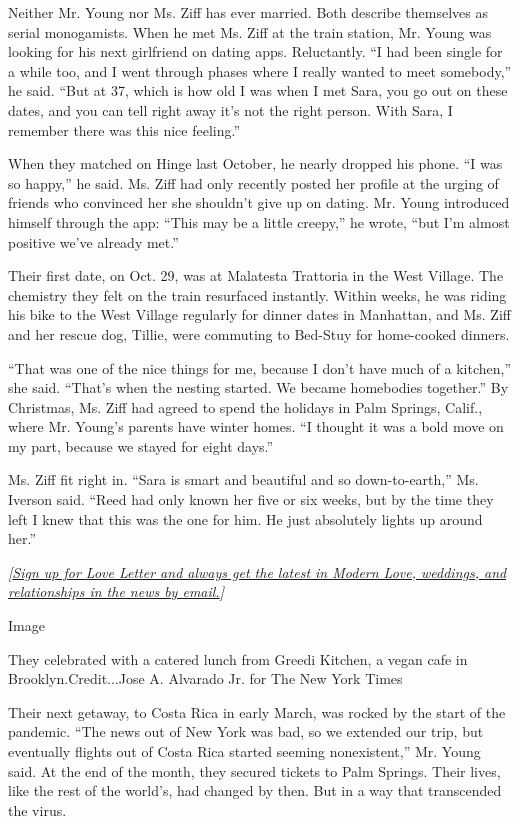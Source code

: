 Neither Mr. Young nor Ms. Ziff has ever married. Both describe
themselves as serial monogamists. When he met Ms. Ziff at the train
station, Mr. Young was looking for his next girlfriend on dating apps.
Reluctantly. ``I had been single for a while too, and I went through
phases where I really wanted to meet somebody,'' he said. ``But at 37,
which is how old I was when I met Sara, you go out on these dates, and
you can tell right away it's not the right person. With Sara, I remember
there was this nice feeling.''

When they matched on Hinge last October, he nearly dropped his phone.
``I was so happy,'' he said. Ms. Ziff had only recently posted her
profile at the urging of friends who convinced her she shouldn't give up
on dating. Mr. Young introduced himself through the app: ``This may be a
little creepy,'' he wrote, ``but I'm almost positive we've already
met.''

Their first date, on Oct. 29, was at Malatesta Trattoria in the West
Village. The chemistry they felt on the train resurfaced instantly.
Within weeks, he was riding his bike to the West Village regularly for
dinner dates in Manhattan, and Ms. Ziff and her rescue dog, Tillie, were
commuting to Bed-Stuy for home-cooked dinners.

``That was one of the nice things for me, because I don't have much of a
kitchen,'' she said. ``That's when the nesting started. We became
homebodies together.'' By Christmas, Ms. Ziff had agreed to spend the
holidays in Palm Springs, Calif., where Mr. Young's parents have winter
homes. ``I thought it was a bold move on my part, because we stayed for
eight days.''

Ms. Ziff fit right in. ``Sara is smart and beautiful and so
down-to-earth,'' Ms. Iverson said. ``Reed had only known her five or six
weeks, but by the time they left I knew that this was the one for him.
He just absolutely lights up around her.''

\emph{{[}}\href{https://www.nytimes.com/newsletters/love-letter?module=inline}{\emph{Sign
up for Love Letter and always get the latest in Modern Love, weddings,
and relationships in the news by email.}}\emph{{]}}

Image

They celebrated with a catered lunch from Greedi Kitchen, a vegan cafe
in Brooklyn.Credit...Jose A. Alvarado Jr. for The New York Times

Their next getaway, to Costa Rica in early March, was rocked by the
start of the pandemic. ``The news out of New York was bad, so we
extended our trip, but eventually flights out of Costa Rica started
seeming nonexistent,'' Mr. Young said. At the end of the month, they
secured tickets to Palm Springs. Their lives, like the rest of the
world's, had changed by then. But in a way that transcended the virus.

